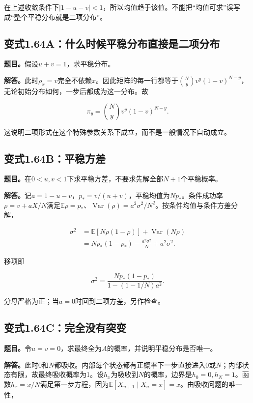 \documentclass[
  11pt,a4paper,UTF8,fontset=fandol]{ctexart}
\begin{document}
在上述收敛条件下\(|1-u-v|<1\)，所以均值趋于该值。不能把``均值可求''误写成``整个平稳分布就是二项分布''。

\subsection{变式1.64A：什么时候平稳分布直接是二项分布}\label{ux53d8ux5f0f1.64aux4ec0ux4e48ux65f6ux5019ux5e73ux7a33ux5206ux5e03ux76f4ux63a5ux662fux4e8cux9879ux5206ux5e03}

\textbf{题目。}假设\(u+v=1\)，求平稳分布。

\textbf{解答。}此时\(\rho_x=v\)完全不依赖\(x\)。因此矩阵的每一行都等于\(\binom Ny v^y(1-v)^{N-y}\)，无论初始分布如何，一步后都成为这一分布。故

\[\boxed{\pi_y=\binom Ny v^y(1-v)^{N-y}.}\]

这说明二项形式在这个特殊参数关系下成立，而不是一般情况下自动成立。

\subsection{变式1.64B：平稳方差}\label{ux53d8ux5f0f1.64bux5e73ux7a33ux65b9ux5dee}

\textbf{题目。}在\(0<u,v<1\)下求平稳方差，不要求先解全部\(N+1\)个平稳概率。

\textbf{解答。}记\(a=1-u-v\)，\(p_*=v/(u+v)\)，平稳均值为\(Np_*\)。条件成功率\(\rho=v+aX/N\)满足\(\mathbb E\rho=p_*\)、\(\operatorname{Var}(\rho)=a^2\sigma^2/N^2\)。按条件均值与条件方差分解，

\[
\begin{aligned}
\sigma^2
&=\mathbb E[N\rho(1-\rho)]+\operatorname{Var}(N\rho)\\
&=Np_*(1-p_*)-\frac{a^2\sigma^2}{N}+a^2\sigma^2.
\end{aligned}
\]

移项即

\[\boxed{\sigma^2=\frac{Np_*(1-p_*)}{1-(1-1/N)a^2}.}\]

分母严格为正；当\(a=0\)时回到二项方差，另作检查。

\subsection{变式1.64C：完全没有突变}\label{ux53d8ux5f0f1.64cux5b8cux5168ux6ca1ux6709ux7a81ux53d8}

\textbf{题目。}令\(u=v=0\)，求最终全为\(A\)的概率，并说明平稳分布是否唯一。

\textbf{解答。}此时0和\(N\)都吸收。内部每个状态都有正概率下一步直接进入0或\(N\)；内部状态有限，故最终吸收概率为1。设\(h_x\)为吸收到\(N\)的概率，边界是\(h_0=0,h_N=1\)。函数\(h_x=x/N\)满足第一步方程，因为\(\mathbb E[X_{n+1}\mid X_n=x]=x\)。由吸收问题的唯一性，
\end{document}
